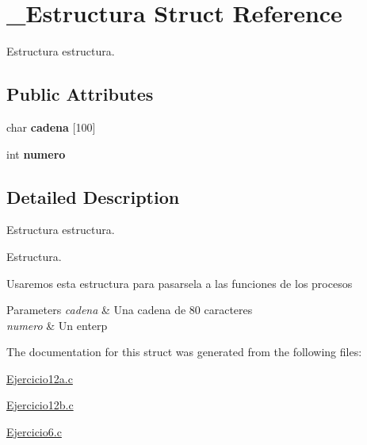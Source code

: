\hypertarget{struct__Estructura}{}\section{\+\_\+\+Estructura Struct Reference}
\label{struct__Estructura}


Estructura estructura.  


\subsection*{Public Attributes}
\begin{DoxyCompactItemize}
\item 
\mbox{\label{struct__Estructura_a7c6d56ad71ec27360233ef17b3cb4458}} 
char {\bfseries cadena} \mbox{[}100\mbox{]}
\item 
\mbox{\label{struct__Estructura_a03532d6c329fc7ca3cad390533dd8d1b}} 
int {\bfseries numero}
\end{DoxyCompactItemize}


\subsection{Detailed Description}
Estructura estructura. 

Estructura.

Usaremos esta estructura para pasarsela a las funciones de los procesos


\begin{DoxyParams}{Parameters}
{\em cadena} & Una cadena de 80 caracteres \\
\hline
{\em numero} & Un enterp \\
\hline
\end{DoxyParams}


The documentation for this struct was generated from the following files\+:\begin{DoxyCompactItemize}
\item 
\hyperlink{Ejercicio12a_8c}{Ejercicio12a.\+c}\item 
\hyperlink{Ejercicio12b_8c}{Ejercicio12b.\+c}\item 
\hyperlink{Ejercicio6_8c}{Ejercicio6.\+c}\end{DoxyCompactItemize}
